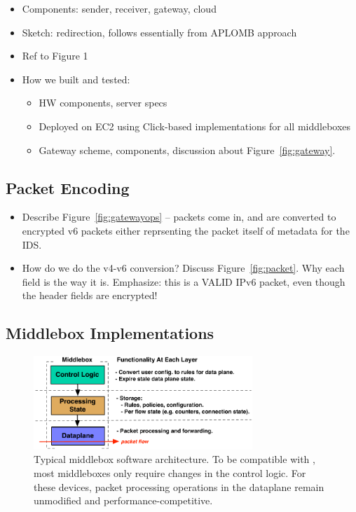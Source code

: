 \begin{itemize}
  \item Components: sender, receiver, gateway, cloud
  \item Sketch: redirection, follows essentially from APLOMB approach
  \item Ref to Figure 1
  \item How we built and tested:
    \begin{itemize}
      \item HW components, server specs
      \item Deployed on EC2 using Click-based implementations for all middleboxes
      \item Gateway scheme, components, discussion about Figure~\ref{fig:gateway}.
    \end{itemize}
\end{itemize}

\subsection{Packet Encoding}


\begin{itemize}
  \item Describe Figure~\ref{fig:gatewayops} -- packets come in, and are converted to encrypted v6 packets either reprsenting the packet itself of metadata for the IDS.
  \item How do we do the v4-v6 conversion? Discuss Figure~\ref{fig:packet}. Why each field is the way it is. Emphasize: this is a VALID IPv6 packet, even though the header fields are encrypted!
\end{itemize}

\subsection{Middlebox Implementations}

\begin{figure}[t]
  \includegraphics[width=3.25in]{fig/mbarch}
  \caption[]{Typical middlebox software architecture. To be compatible with \sys, most middleboxes only require changes in the control logic. For these devices, packet processing operations in the dataplane remain unmodified and performance-competitive.}
\end{figure}

